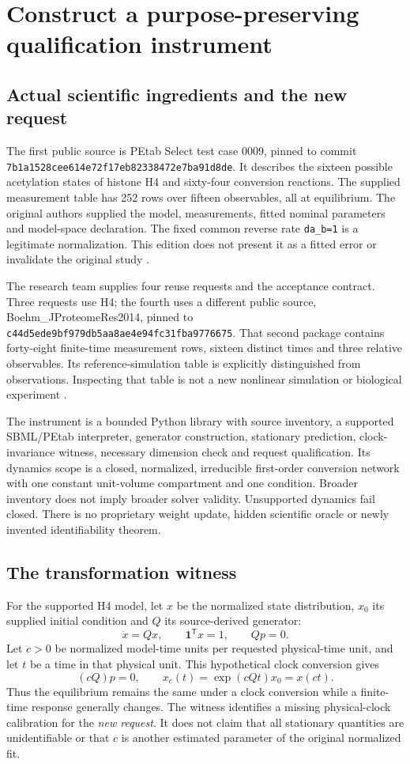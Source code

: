 \section{Construct a purpose-preserving qualification instrument}
\subsection{Actual scientific ingredients and the new request}
The first public source is PEtab Select test case 0009, pinned to commit \nolinkurl{7b1a1528cee614e72f17eb82338472e7ba91d8de}. It describes the sixteen possible acetylation states of histone H4 and sixty-four conversion reactions. The supplied measurement table has 252 rows over fifteen observables, all at equilibrium. The original authors supplied the model, measurements, fitted nominal parameters and model-space declaration. The fixed common reverse rate \texttt{da\_b=1} is a legitimate normalization. This edition does not present it as a fitted error or invalidate the original study \cite{h4}.

The research team supplies four reuse requests and the acceptance contract. Three requests use H4; the fourth uses a different public source, Boehm\_JProteomeRes2014, pinned to \nolinkurl{c44d5ede9bf979db5aa8ae4e94fc31fba9776675}. That second package contains forty-eight finite-time measurement rows, sixteen distinct times and three relative observables. Its reference-simulation table is explicitly distinguished from observations. Inspecting that table is not a new nonlinear simulation or biological experiment \cite{boehm}.

The instrument is a bounded Python library with source inventory, a supported SBML/PEtab interpreter, generator construction, stationary prediction, clock-invariance witness, necessary dimension check and request qualification. Its dynamics scope is a closed, normalized, irreducible first-order conversion network with one constant unit-volume compartment and one condition. Broader inventory does not imply broader solver validity. Unsupported dynamics fail closed. There is no proprietary weight update, hidden scientific oracle or newly invented identifiability theorem.

\subsection{The transformation witness}
For the supported H4 model, let $x$ be the normalized state distribution, $x_0$ its supplied initial condition and $Q$ its source-derived generator:
\[
\dot x=Qx,\qquad \mathbf{1}^{\mathsf T}x=1,\qquad Qp=0.
\]
Let $c>0$ be normalized model-time units per requested physical-time unit, and let $t$ be a time in that physical unit. This hypothetical clock conversion gives
\[
(cQ)p=0,\qquad x_c(t)=\exp(cQt)x_0=x(ct).
\]
Thus the equilibrium remains the same under a clock conversion while a finite-time response generally changes. The witness identifies a missing physical-clock calibration for the \emph{new request}. It does not claim that all stationary quantities are unidentifiable or that $c$ is another estimated parameter of the original normalized fit.

